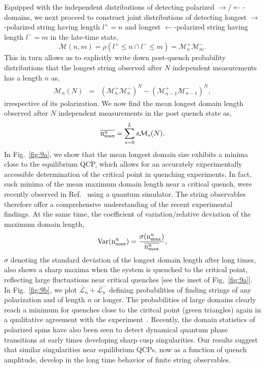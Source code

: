 \documentclass[aps,prx,twocolumn]{revtex4-2}
\newcommand{\ct}{\cite}
\begin{document}
 {Equipped with the independent distributions of detecting polarized $\rightarrow/\leftarrow$-domains, we next proceed to construct joint distributions of detecting longest $\rightarrow$-polarized string having length $l^+=n$ and longest $\leftarrow$-polarized string having length $l^-=m$ in the late-time state,
\begin{equation}
\mathcal{M}(n,m)=\rho\left(l^+\leq n\cap l^-\leq m\right)=\mathcal{M}_n^+\mathcal{M}_m^-.
\end{equation}
This in turn allows us to explicitly write down post-quench probability distributions that the longest   string observed after $N$ independent measurements has a length $n$ as,
\begin{eqnarray}\label{eq:exclusive_u}
	\nonumber\mathcal{M}_n(N)&=&\left(\mathcal{M}_n^+\mathcal{M}_n^-\right)^N-\left(\mathcal{M}_{n-1}^+\mathcal{M}_{n-1}^-\right)^N,
\end{eqnarray}
irrespective of its polarization.
We now find the mean longest   domain length observed after $N$ independent measurements in the post quench state as,
\begin{equation}
\overline{{\rm n_{max}^u}}=\sum\limits_{s=0}^Ls\mathcal{M}_s(N).
\end{equation}
In Fig.~\ref{fig:9a}, we show that the mean longest domain size exhibits a minima close to the equilibrium QCP, which allows for an accurately experimentally accessible determination of the critical point in quenching experiments. In fact, such minima of the mean maximum domain length near a critical quench,  were recently observed in Ref.~\cite{Zhang2017} using a quantum simulator. The string observables therefore offer a comprehensive understanding of the recent experimental findings.  At the same time, the coefficient of variation/relative deviation of the maximum domain length,
\begin{equation}
{\rm Var}({\rm n_{max}^u})=\frac{\sigma({\rm n_{max}^u)}}{\overline{{\rm n_{max}^u}}},
\end{equation}
$\sigma$ denoting the standard deviation of the longest domain length after long times, also shows a sharp maxima when the system is quenched to the critical point, reflecting large fluctuations near critical quenches [see the inset of  Fig,~\ref{fig:9a}].  In Fig.~\ref{fig:9b}, we plot $\bar{\mathcal{L}}_n+\bar{\mathcal{L}}_n^-$ defining probabilities of finding strings of any polarization and of length $n$ or longer.  The probabilities of large domains clearly reach a minimum for quenches close to the ciritcal point (green triangles) again in a qualitative agreement with the experiment~\cite{Zhang2017}.  Recently, the domain statistics of polarized spins have also been seen \ct{jad21,pol21,heyl21} to detect dynamical quantum phase transitions at early times developing sharp cusp singularities. Our results suggest that similar singularities near equilibrium QCPs, now as a function of quench amplitude, develop in the long time behavior of finite string observables.}\\
\end{document}
